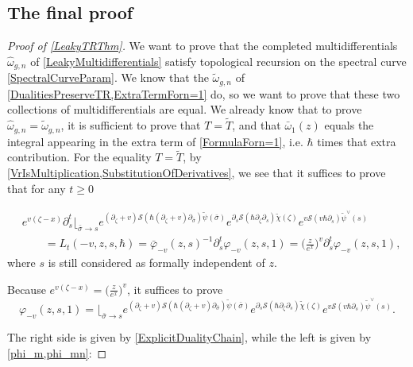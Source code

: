 \documentclass[10pt,a4paper,oneside,no-math,reqno]{amsart}%
\theoremstyle{plain}
\theoremstyle{definition}
\theoremstyle{remark}
\numberwithin{equation}{section}
\renewcommand{\phi}{\varphi}
\newcommand{\mc}[1]{\mathcal{#1}}
\newcommand{\1}{\mathds{1}}
\newcommand{\<}{\langle}
\renewcommand{\>}{\rangle}
\newcommand{\del}{\partial}
\begin{document}
\subsection{The final proof}

\begin{proof}[Proof of \cref{LeakyTRThm}]
	We want to prove that the completed multidifferentials $ \widehat{\omega}_{g,n}$ of \cref{LeakyMultidifferentials} satisfy topological recursion on the spectral curve \eqref{SpectralCurveParam}. We know that the $ \tilde{\omega}_{g,n}$ of \cref{DualitiesPreserveTR,ExtraTermForn=1} do, so we want to prove that these two collections of multidifferentials are equal. We already know that to prove $ \widehat{\omega}_{g,n} = \tilde{\omega}_{g,n}$, it is sufficient to prove that $ T = \tilde{T}$, and that $ \bar{\omega}_1(z) $ equals the integral appearing in the extra term of \cref{FormulaForn=1}, i.e. $\hbar$ times that extra contribution. For the equality $ T = \tilde{T}$, by \cref{VrIsMultiplication,SubstitutionOfDerivatives}, we see that it suffices to prove that for any $ t \geq 0$

	\begin{equation}\label{LAsExponentials}
		\begin{split}
			&e^{v (\zeta - x)}
			\del_s^t \Big\lfloor_{\bar{\sigma} \to s}
			e^{ (\del_\zeta +v) \mc{S}( \hbar (\del_\zeta + v) \del_{\bar{\sigma}} )\tilde{\psi} (\bar{\sigma}) }
			e^{ \del_s \mc{S}( \hbar \del_\zeta \del_s ) \tilde{\chi} (\zeta) }
			e^{v \mc{S}(v \hbar \del_s) \tilde{\psi}^\vee (s)}
			\\
			&\qquad =
			L_t(-v, z, s, \hbar)
			=
			\bar{\phi}_{-v}(z,s)^{-1} \del_s^t \phi_{-v}(z, s, 1)
			=
			\Big( \frac{z}{e^x} \Big)^{v} \del_s^t \phi_{-v}(z, s, 1) ,
		\end{split}
	\end{equation}
	where $s$ is still considered as formally independent of $ z$.\par
	Because $ e^{v(\zeta - x)} = \big( \frac{z}{e^x} \big)^v$, it suffices to prove
	\begin{equation}\label{phiAsExponentials}
		\phi_{-v}(z, s, 1)
		=
		\Big\lfloor_{\bar{\sigma} \to s}
		e^{ (\del_\zeta +v) \mc{S}( \hbar (\del_\zeta + v) \del_{\bar{\sigma}} )\tilde{\psi} (\bar{\sigma}) }
		e^{ \del_s \mc{S}( \hbar \del_\zeta \del_s ) \tilde{\chi} (\zeta) }
		e^{v \mc{S}(v \hbar \del_s) \tilde{\psi}^\vee (s)} .
	\end{equation}

	The right side is given by \cref{ExplicitDualityChain}, while the left is given by \cref{phi_m,phi_mn}:


\end{proof}
\end{document}
